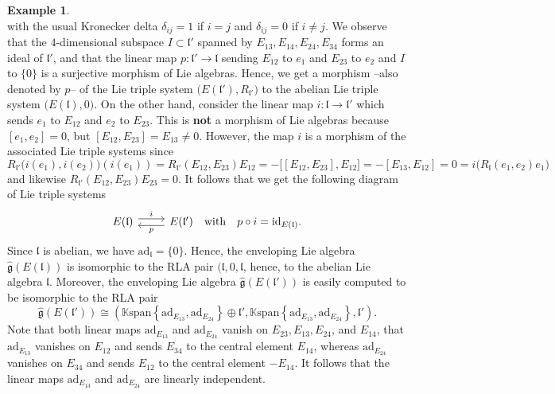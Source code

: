\documentclass [11pt] {article}
\theoremstyle{definition}
\newtheorem{example}[lemma]{Example}
\begin{document}
\begin{example}
\[\]
with the usual Kronecker delta $\delta_{ij}=1$ if $i=j$ and $\delta_{ij}=0$ if
$i\not = j$. We observe that the $4$-dimensional subspace $I\subset \mathfrak{l}'$
spanned by $E_{13},E_{14},E_{24}, E_{34}$ forms an ideal of $\mathfrak{l}'$, and that the linear map $p:\mathfrak{l}'\to\mathfrak{l}$ sending $E_{12}$ to $e_1$
and 
$E_{23}$ to $e_2$ and $I$ to $\{0\}$ is a surjective morphism of Lie algebras.
Hence, we get a morphism --also denoted by $p$-- of the Lie triple system
$\big(E(\mathfrak{l}'),R_{\mathfrak{l}'}\big)$ to the abelian Lie triple system $\big(E(\mathfrak{l}),0\big)$. On the other hand, consider the linear map
$i:\mathfrak{l}\to \mathfrak{l}'$ which sends $e_1$ to $E_{12}$ and $e_2$ to
$E_{23}$. This is \textbf{not} a morphism of Lie algebras because
$[e_1,e_2]=0$, but $[E_{12},E_{23}]=E_{13}\not = 0$. However, the map $i$ is a morphism
of the associated Lie triple systems since
\[
R_{\mathfrak{l}'}\big(i(e_1),i(e_2)\big)(i(e_1))=
  R_{\mathfrak{l}'}(E_{12},E_{23})E_{12}=-\big[[E_{12},E_{23}],E_{12}\big]
     =-[E_{13},E_{12}]=0=i\big(R_\mathfrak{l}(e_1,e_2)e_1\big)
\]
and likewise $R_{\mathfrak{l}'}(E_{12},E_{23})E_{23}=0$. It follows that we get
the following diagram of Lie triple systems
\[
\begin{tikzcd}
	E(\mathfrak{l})
	   \arrow[r, yshift=0.7ex, "i"] 
	     & E(\mathfrak{l}')
	     \arrow[l, yshift=-0.7ex, "p"] 
	     ~~~\mathrm{with}~~~ p\circ i=\mathrm{id}_{E(\mathfrak{l})}.
\end{tikzcd}
\]
Since $\mathfrak{l}$ is abelian, we have $\mathrm{ad}_{\mathfrak{l}}=\{0\}$.
Hence, the enveloping Lie algebra $\hat{\mathfrak{g}}(E(\mathfrak{l}))$
is isomorphic to the RLA pair $\big(\mathfrak{l},0,\mathfrak{l}$, hence, to the abelian Lie algebra $\mathfrak{l}$. Moreover, the enveloping Lie algebra $\hat{\mathfrak{g}}(E(\mathfrak{l}'))$ is easily computed to be isomorphic
to the RLA pair
\[
   \hat{\mathfrak{g}}(E(\mathfrak{l}')) 
   \cong \left(\mathbb{K}\mathrm{span}\left\{\mathrm{ad}_{E_{13}},
        \mathrm{ad}_{E_{24}}\right\}
     \oplus \mathfrak{l}', \mathbb{K}\mathrm{span}\left\{\mathrm{ad}_{E_{13}},
     \mathrm{ad}_{E_{24}}\right\}, \mathfrak{l}'\right).
\]
Note that both linear maps $\mathrm{ad}_{E_{13}}$ and $\mathrm{ad}_{E_{24}}$
vanish on $E_{23}, E_{13}, E_{24}$, and $E_{14}$, that $\mathrm{ad}_{E_{13}}$ vanishes on $E_{12}$ and sends $E_{34}$ to the central element $E_{14}$,
whereas $\mathrm{ad}_{E_{24}}$ vanishes on $E_{34}$ and sends $E_{12}$ to the central element $-E_{14}$. It follows that the linear maps $\mathrm{ad}_{E_{13}}$ and $\mathrm{ad}_{E_{24}}$ are linearly independent.\\

\end{example}
\end{document}
